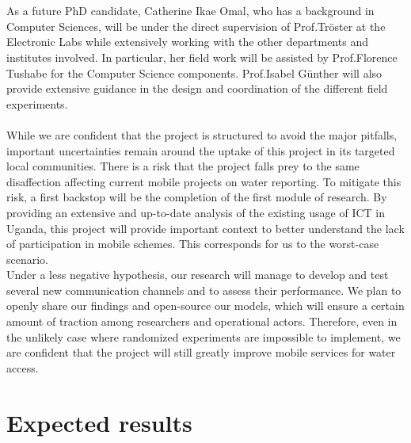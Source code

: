 \documentclass[11pt]{article}
\begin{document}
\\\\
As a future PhD candidate, Catherine Ikae Omal, who has a background in Computer Sciences, will be under the direct supervision of Prof.Tr\"{o}ster at the Electronic Labs while extensively working with the other departments and institutes involved. In particular, her field work will be assisted by Prof.Florence Tushabe for the Computer Science components. Prof.Isabel G\"{u}nther will also provide extensive guidance in the design and coordination of the different field experiments.
\\\\
While we are confident that the project is structured to avoid the major pitfalls, important uncertainties remain around the uptake of this project in its targeted local communities. There is a risk that the project falls prey to the same disaffection affecting current mobile projects on water reporting. To mitigate this risk, a first backstop will be the completion of the first module of research. By providing an extensive and up-to-date analysis of the existing usage of ICT in Uganda, this project will provide important context to better understand the lack of participation in mobile schemes. This corresponds for us to the worst-case scenario.
\\
Under a less negative hypothesis, our research will manage to develop and test several new communication channels and to assess their performance. We plan to openly share our findings and open-source our models, which will ensure a certain amount of traction among researchers and operational actors. Therefore, even in the unlikely case where randomized experiments are impossible to implement, we are confident that the project will still greatly improve mobile services for water access.


\section{Expected results}\label{expected}
\end{document}
